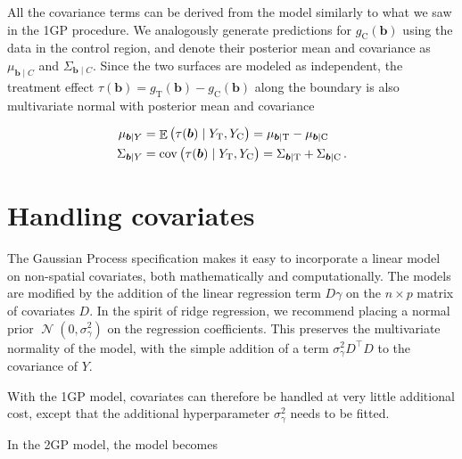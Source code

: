 \documentclass[letter]{article}
\DeclareMathOperator{\E}{\mathbb{E}}
\DeclareMathOperator{\cov}{{cov}}
\DeclareMathOperator{\normal}{\mathcal{N}}
\newcommand{\trans}{^{\intercal}}
\newcommand{\treat}{\mathrm{T}}
\newcommand{\ctrol}{\mathrm{C}}
\newcommand{\sigmagamma}{\sigma_{\gamma}}
\newcommand{\sentinels}{\bm{b}}
\newcommand{\eqlabel}[1]{\label{#1}}
\begin{document}
All the covariance terms can be derived from the model similarly to what we saw in the 1GP procedure.
We analogously generate predictions for \(g_\ctrol{}(\sentinels)\) using the data in the control region, and denote their posterior mean and covariance as \(\mu_{\sentinels \mid C}\) and \(\Sigma_{\sentinels \mid C}\). Since the two surfaces are modeled as independent, the treatment effect \(\tau(\sentinels)=g_\treat{}(\sentinels)-g_\ctrol{}(\sentinels)\) along the boundary is also multivariate normal with posterior mean and covariance

\begin{equation}
\begin{split}
    \mu_{\sentinels \mid Y} &= \E \del{\tau(\sentinels) \mid Y_\treat{}, Y_\ctrol{}} = \mu_{\sentinels \mid \treat} - \mu_{\sentinels \mid \ctrol} \\
    \Sigma_{\sentinels \mid Y} &= \cov\del{\tau(\sentinels) \mid Y_\treat{}, Y_\ctrol{}} = \Sigma_{\sentinels \mid \treat} + \Sigma_{\sentinels \mid \ctrol}\,.
\end{split}
\eqlabel{eq:postvar2gp}
\end{equation}
    


    	\section{Handling covariates}\label{handling-covariates}

The Gaussian Process specification makes it easy to incorporate a linear model on non-spatial covariates, both mathematically and computationally.
The models are modified by the addition of the linear regression term \(D \gamma\) on the \(n \times p\) matrix of covariates \(D\). In the spirit of ridge regression, we recommend placing a normal prior \(\normal(0,\sigmagamma^2)\) on the regression coefficients. This preserves the multivariate normality of the model, with the simple addition of a term \(\sigmagamma^2 D\trans D\) to the covariance of \(Y\).

With the 1GP model, covariates can therefore be handled at very little additional cost, except that the additional hyperparameter \(\sigmagamma^2\) needs to be fitted.

In the 2GP model, the model becomes
\end{document}
